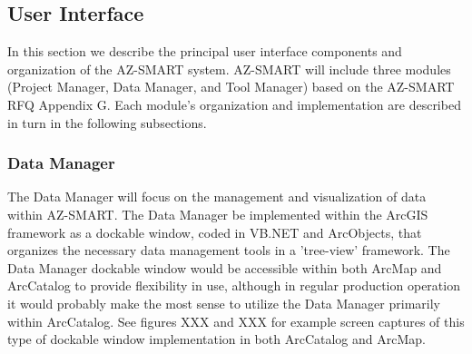\subsection{User Interface}

In this section we describe the principal user interface components
and organization of the AZ-SMART system.  AZ-SMART will include
three modules (Project Manager, Data Manager, and Tool Manager)
based on the AZ-SMART RFQ Appendix G. Each module's organization and
implementation are described in turn in the following subsections.



\subsubsection{Data Manager}

The Data Manager will focus on the management and visualization of
data within AZ-SMART.  The Data Manager be implemented within the
ArcGIS framework as a dockable window, coded in VB.NET and ArcObjects,
that organizes the necessary data management tools in a
'tree-view' framework.  The Data Manager dockable window would be
accessible within both ArcMap and ArcCatalog to provide flexibility
in use, although in regular production operation it would probably
make the most sense to utilize the Data Manager primarily within
ArcCatalog.  See figures XXX and XXX for example screen captures
of this type of dockable window implementation in both ArcCatalog
and ArcMap.


